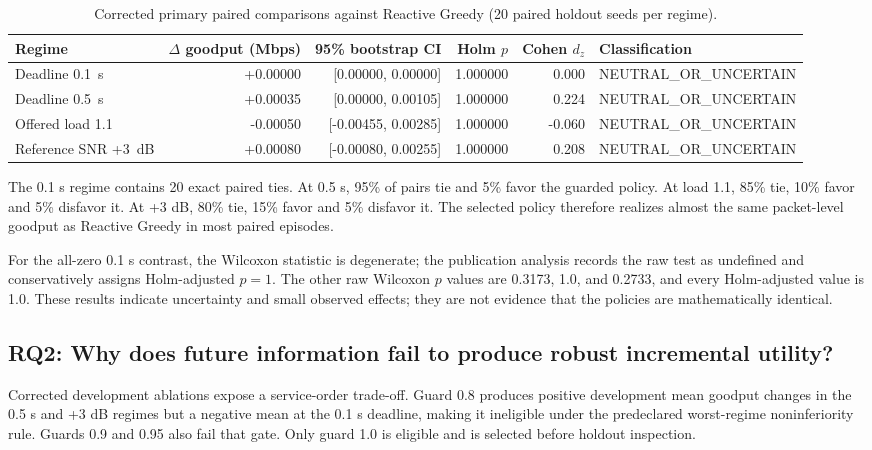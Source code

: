 \documentclass[conference]{IEEEtran}
\begin{document}
\begin{table}[t]
\centering
\caption{Corrected primary paired comparisons against Reactive Greedy (20 paired holdout seeds per regime).}
\label{tab:primary}
\begin{tabular}{lrrrrl}
\toprule
Regime & $\Delta$ goodput (Mbps) & 95\% bootstrap CI & Holm $p$ & Cohen $d_z$ & Classification \\
\midrule
Deadline 0.1~s & +0.00000 & [0.00000, 0.00000] & 1.000000 & 0.000 & NEUTRAL\_OR\_UNCERTAIN \\
Deadline 0.5~s & +0.00035 & [0.00000, 0.00105] & 1.000000 & 0.224 & NEUTRAL\_OR\_UNCERTAIN \\
Offered load 1.1 & -0.00050 & [-0.00455, 0.00285] & 1.000000 & -0.060 & NEUTRAL\_OR\_UNCERTAIN \\
Reference SNR +3~dB & +0.00080 & [-0.00080, 0.00255] & 1.000000 & 0.208 & NEUTRAL\_OR\_UNCERTAIN \\
\bottomrule
\end{tabular}
\end{table}

The 0.1 s regime contains 20 exact paired ties. At 0.5 s, 95\% of pairs tie and 5\% favor the guarded policy. At load 1.1, 85\% tie, 10\% favor and 5\% disfavor it. At +3 dB, 80\% tie, 15\% favor and 5\% disfavor it. The selected policy therefore realizes almost the same packet-level goodput as Reactive Greedy in most paired episodes.

For the all-zero 0.1 s contrast, the Wilcoxon statistic is degenerate; the publication analysis records the raw test as undefined and conservatively assigns Holm-adjusted $p=1$. The other raw Wilcoxon $p$ values are 0.3173, 1.0, and 0.2733, and every Holm-adjusted value is 1.0. These results indicate uncertainty and small observed effects; they are not evidence that the policies are mathematically identical.

\subsection{RQ2: Why does future information fail to produce robust incremental utility?}
Corrected development ablations expose a service-order trade-off. Guard 0.8 produces positive development mean goodput changes in the 0.5 s and +3 dB regimes but a negative mean at the 0.1 s deadline, making it ineligible under the predeclared worst-regime noninferiority rule. Guards 0.9 and 0.95 also fail that gate. Only guard 1.0 is eligible and is selected before holdout inspection.
\end{document}
